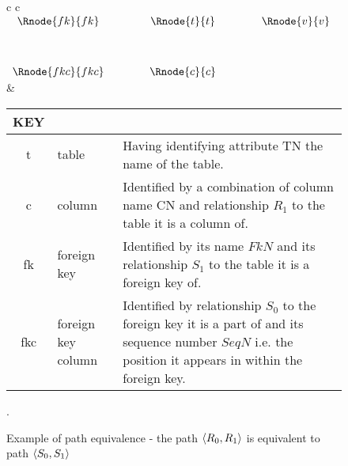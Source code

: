 \documentclass[10pt,a4paper]{article}
\begin{document}
\begin{figure} [H]
\begin{center}
\begin{tabular}{c c}
$
\begin{array}{cp{0.75cm}cp{0.75cm}c}
   \Rnode{fk}{fk}     & & \Rnode{t}{t} & & \Rnode{v}{v} \\[1.2cm]     
	 \Rnode{fkc}{fkc}   & & \Rnode{c}{c} & &               
\end{array}
$
\idcomp
{} 
\idcomp
{}
\idcomp
{}
\idcomp
{}
\idcomp
{}
\idcomp
& \footnotesize
\begin{tabular}{c p{1.5cm} p{4cm}}
KEY && \\
\hline
t & table & Having identifying attribute TN the name of the table. \\
c & column & Identified by a combination of column name CN and relationship $R_1$ to the table it is a column of.\\
fk & foreign key & Identified by its name $FkN$ and its relationship $S_1$ to the table it is a foreign key of.\\
fkc & foreign key column & Identified by relationship $S_0$ to the foreign key it is a part of and its sequence number $SeqN$ i.e. the position it appears in within the foreign key. \\
\end{tabular} 
\end{tabular}
\end{center}
\caption{Example of path equivalence - the path $\langle R_0,R_1\rangle$ is equivalent to path $\langle S_0,S_1\rangle$}.
\label{foreignkeygraph}
\end{figure}
\end{document}

